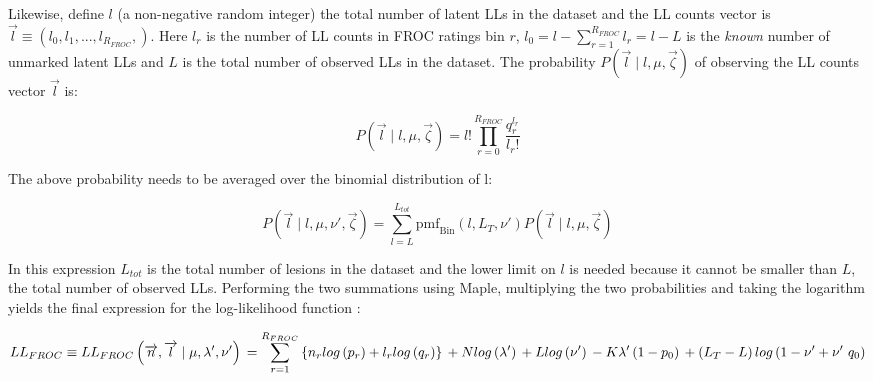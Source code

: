 \documentclass[
]{book}
\begin{document}
Likewise, define \(l\) (a non-negative random integer) the total number of latent LLs in the dataset and the LL counts vector is \(\overrightarrow{l} \equiv \left ( l_0, l_1, ...,l_{R_{FROC}}, \right )\). Here \(l_r\) is the number of LL counts in FROC ratings bin \(r\), \(l_0 = l - \sum_{r=1}^{R_{FROC}} l_r = l - L\) is the \emph{known} number of unmarked latent LLs and \(L\) is the total number of observed LLs in the dataset. The probability \(P\left ( \overrightarrow{l} \mid l, \mu, \overrightarrow{\zeta} \right )\) of observing the LL counts vector \(\overrightarrow{l}\) is:

\begin{equation}
P\left ( \overrightarrow{l} \mid l, \mu, \overrightarrow{\zeta} \right ) = l! \prod_{r=0}^{R_{FROC}} \frac{q_r^{l_r}}{l_r!}
\label{eq:rsm-fitting-plvector}
\end{equation}

The above probability needs to be averaged over the binomial distribution of l:

\begin{equation}
P\left ( \overrightarrow{l} \mid l, \mu, \nu', \overrightarrow{\zeta} \right ) = \sum_{l=L}^{L_{tot}}\text{pmf}_{\text{Bin}} \left ( l, L_T, \nu' \right ) P\left ( \overrightarrow{l} \mid l, \mu, \overrightarrow{\zeta} \right )
\label{eq:rsm-fitting-p-l-mu-nu-prime-zeta}
\end{equation}

In this expression \(L_{tot}\) is the total number of lesions in the dataset and the lower limit on \(l\) is needed because it cannot be smaller than \(L\), the total number of observed LLs. Performing the two summations using Maple, multiplying the two probabilities and taking the logarithm yields the final expression for the log-likelihood function \citep{RN1652}:

\begin{equation}
LL_{FROC} \equiv LL_{FROC}\left ( \overrightarrow{n}, \overrightarrow{l} \mid \mu, \lambda', \nu' \right ) \\
= \sum_{r=1}^{R_{FROC}} \left \{ n_r log\left ( p_r \right ) + l_r log\left ( q_r \right ) \right \} \\
+ N log\left ( \lambda' \right ) \\
+ L log\left ( \nu' \right ) \\
- K \lambda' \left ( 1-p_0 \right ) \\
+ \left ( L_T - L \right ) log \left ( 1 - \nu' + \nu' \ q_0 \right )
\label{eq:rsm-fitting-froc-ll}
\end{equation}
\end{document}
